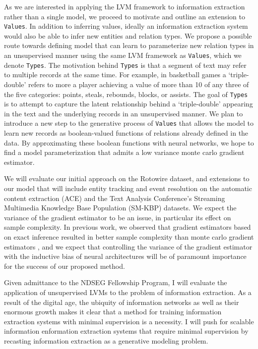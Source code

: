 \documentclass[11pt]{article}
\begin{document}
As we are interested in applying the LVM framework to information extraction rather than a single model,
we proceed to motivate and outline an extension to \texttt{Values}.
In addition to inferring values, ideally an information extraction system 
would also be able to infer new entities and relation types.
We propose a possible route towards defining model that can
learn to parameterize new relation types in an
unsupervised manner using the same LVM framework as \texttt{Values},
which we denote \texttt{Types}.
The motivation behind \texttt{Types} is that a segment of text may refer to multiple records at the same time.
For example, in basketball games a `triple-double' refers to more a player achieving a value of more than 10
of any three of the five categories: points, steals, rebounds, blocks, or assists.
The goal of \texttt{Types} is to attempt to capture the latent relationship behind a `triple-double' appearing in 
the text and the underlying records in an unsupervised manner.
We plan to introduce a new step to the generative process of \texttt{Values} that 
allows the model to learn new records as boolean-valued functions of relations already defined in the data.
By approximating these boolean functions with neural networks, we hope to find a model
parameterization that admits a low variance monte carlo gradient estimator.

We will evaluate our initial approach on the Rotowire dataset, and
extensions to our model that will include entity tracking and event resolution on the 
automatic content extraction (ACE) \citep{ace2004} and the Text Analysis Conference's
Streaming Multimedia Knowledge Base Population (SM-KBP) datasets.
We expect the variance of the gradient estimator to be an issue, in particular its
effect on sample complexity. In previous work, we observed that gradient estimators
based on exact inference resulted in better sample complexity than
monte carlo gradient estimators \citep{deng2018attn}, and we expect that controlling the variance 
of the gradient estimator with the inductive bias of neural architectures will be of paramount
importance for the success of our proposed method.

Given admittance to the NDSEG Fellowship Program, I will evaluate the application of
unsupervised LVMs to the problem of information extraction.
As a result of the digital age, the ubiquity of information networks as well as their 
enormous growth makes it clear that a method for training information extraction systems
with minimal supervision is a necessity.
I will push for scalable information enformation extraction systems that require minimal supervision
by recasting information extraction  as a generative modeling problem.
\end{document}
